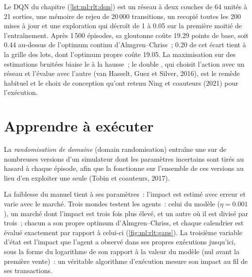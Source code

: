 Le DQN du chapitre (\cref{lst:ml:rlt:dqn}) est un réseau à deux couches de 64 unités à 21 sorties, une mémoire de rejeu de 20\,000
transitions, un  recopié toutes les 200 mises à jour et une exploration qui décroît de 1 à 0.05 sur la première moitié de
l'entraînement. Après 1\,500 épisodes, sa  gloutonne coûte 19.29 points de base, soit 0.44 au-dessus de l'optimum continu
d'Almgren--Chriss~; 0.20 de cet écart tient à la grille des lots, dont l'optimum propre coûte 19.05. La maximisation sur des estimations bruitées biaise le 
à la hausse~; le double , qui choisit l'action avec un réseau et l'évalue avec l'autre (van Hasselt, Guez et
Silver, 2016), est le remède habituel et le choix de conception qu'ont retenu Ning et coauteurs (2021) pour l'exécution.

\section{Apprendre à exécuter}

\begin{definition}\label{def:ml:reinforcement-learning-for-execution-and-market-making:dr}
La \emph{randomisation de domaine} (domain randomisation) entraîne une  sur de nombreuses versions d'un simulateur dont les paramètres incertains
sont tirés au hasard à chaque épisode, afin que la  fonctionne sur l'ensemble de ces versions au lieu d'en exploiter une seule (Tobin et
coauteurs, 2017).
\end{definition}

La faiblesse du manuel tient à ses paramètres~: l'impact est estimé avec erreur et varie avec le marché. Trois mondes testent les
agents~: celui du modèle ($\eta = 0.001$), un marché dont l'impact est trois fois plus élevé, et un autre où il est divisé par trois~; chacun a son propre
optimum d'Almgren--Chriss, et chaque calendrier est évalué exactement par rapport à celui-ci (\cref{fig:ml:rlt:gaps}). La troisième variable d'état
est l'impact que l'agent a observé dans ses propres exécutions jusqu'ici, sous la forme du logarithme de son rapport à la valeur du modèle (nul avant
la première vente)~: un véritable algorithme d'exécution mesure son impact au fil de ses transactions.

